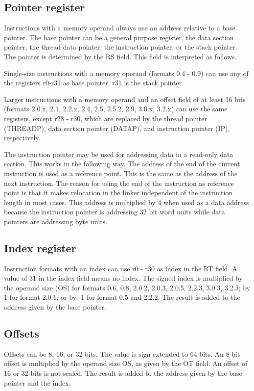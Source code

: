 \documentclass[forwardcom.tex]{subfiles}
\begin{document}
\subsection{Pointer register}
Instructions with a memory operand always use an address relative to a base pointer. The base pointer can be a general purpose register, the data section pointer, the thread data pointer, the instruction pointer, or the stack pointer. The pointer is determined by the RS field. This field is interpreted as follows.
\vv

Single-size instructions with a memory operand (formats 0.4 - 0.9) can use any of the registers r0-r31 as base pointer. r31 is the stack pointer.
\vv

Larger instructions with a memory operand and an offset field of at least 16 bits (formats 2.0.x, 2.1, 2.2.x, 2.4, 2.5, 2.5.2, 2.9, 3.0.x, 3.2.x) can use the same registers, except r28 - r30,  which are replaced by the thread pointer (THREADP), data section pointer (DATAP), and instruction pointer (IP), respectively.
\vv

The instruction pointer may be used for addressing data in a read-only data section. This works in the following way. The address of the end of the current instruction is used as a reference point. This is the same as the address of the next instruction. The reason for using the end of the instruction as reference point is that it makes relocation in the linker independent of the instruction length in most cases. This address is multiplied by 4 when used as a data address because the instruction pointer is addressing 32 bit word units while data pointers are addressing byte units.
\vv


\subsection{Index register}
Instruction formats with an index can use r0 - r30 as index in the RT field. 
A value of 31 in the index field means no index. The signed index is multiplied by the operand size (OS) for formats 0.6, 0.8, 2.0.2, 2.0.3, 2.0.5, 2.2.3, 3.0.3, 3.2.3; by 1 for format 2.0.1; or by -1 for format 0.5 and 2.2.2. The result is added to the address given by the base pointer.
\vv

\subsection{Offsets}
Offsets can be 8, 16, or 32 bits. The value is sign-extended to 64 bits. An 8-bit offset is multiplied by the operand size OS, as given by the OT field. An offset of 16 or 32 bits is not scaled. The result is added to the address given by the base pointer and the index.
\vv
\end{document}
